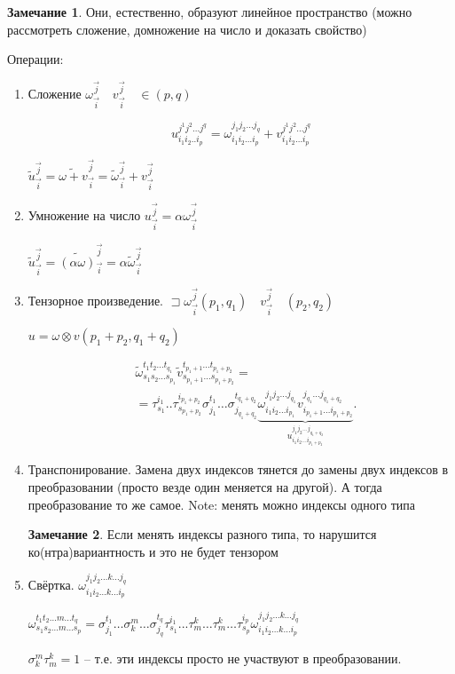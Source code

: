 \documentclass{book}
\newcommand{\tl}[1]{\widetilde{#1}}
\theoremstyle{definition}
\newtheorem*{note}{Замечание}
\begin{document}
\begin{note}
    Они, естественно, образуют линейное пространство (можно рассмотреть сложение, домножение на число и доказать свойство)
\end{note}

Операции:
\begin{enumerate}
    \item Сложение \quad $\omega_{\vec i}^{\vec j}\quad v_{\vec i}^{\vec j}\quad \in (p,q)$

         \[
         u_{i_1i_2 .. i_p}^{j^1 j^2 \ldots j^q} = \omega_{i_1i_2 \ldots i_p}^{j_1j_2 \ldots j_q} + v_{i_1i_2 \ldots i_p}^{j^1 j^2 \ldots j^q} \]

             $\tl u_{\vec i}^{\vec j} = \tl{\omega + v}_{\vec i}^{\vec j} = \tl \omega_{\vec i}^{\vec j} + v_{\vec i }^{\vec j}$
         \item Умножение на число $u_{\vec i}^{\vec j} = \alpha \omega_{\vec i}^{\vec j}$

             $\tl u_{\vec i}^{\vec j} = \tl {\left( \alpha \omega \right) }_{\vec i}^{\vec j} = \alpha \tl {\omega}_{\vec i}^{\vec j}$
         \item Тензорное произведение. $\sqsupset \omega_{\vec i}^{\vec j} \left( p_1, q_1 \right) \quad v_{\vec i}^{\vec j}\quad (p_2, q_2)$

             $u = \omega \otimes v \left( p_1+p_2, q_1+q_2 \right) $

    \begin{align*}
    &\tl \omega_{s_1s_2 \ldots s_{p_1}}^{t_1t_2 \ldots t_{q_1}}\tl v_{s_{p_1+1} \ldots s_{p_1+p_2}}^{t_{p_1+1} ... t_{p_1+p_2}} =\\
    &= \tau_{s_1}^{i_1} ..  \tau_{s_{p_1+p_2}}^{i_{p_1+p_2}} \sigma_{j_1}^{t_1} \ldots \sigma_{j_{q_1+q_2}}^{t_{q_1+q_2}} \underbrace{\omega_{i_1i_2 \ldots i_{p_1}}^{j_1j_2 \ldots j_{q_1}}v_{i_{p_1+1}\ldots i_{p_1+p_2}}^{j_{q_1} \ldots j_{q_1+q_2}}}_{u_{i_1 i_2 \ldots i_{p_1+p_2}}^{j_1j_2 \ldots j_{q_1+q_2}}}
    .\end{align*}
\item Транспонирование. Замена двух индексов тянется до замены двух индексов в преобразовании (просто везде один меняется на другой). А тогда преобразование то же самое. Note: менять можно индексы одного типа
    \begin{note}
        Если менять индексы разного типа, то нарушится ко(нтра)вариантность и это не будет тензором
    \end{note}
\item Свёртка. $\omega_{i_1 i_2 \ldots k \ldots i_p}^{j_1 j_2 \ldots k \ldots j_q}$

    $\omega_{s_1s_2 \ldots m \ldots s_p}^{t_1t_2 \ldots m \ldots t_q} = \sigma_{j_1}^{t_1} \ldots \sigma_k^m \ldots \sigma_{j_q}^{t_q}\tau_{s_1}^{i_1} ... \tau_m^k \ldots \tau_m^k \ldots \tau_{s_p}^{i_p}\omega_{i_1i_2 \ldots k \ldots i_p}^{j_1j_2 \ldots k \ldots j_q}$

    $\sigma_k^m\tau_m^k = 1$ -- т.е. эти индексы просто не участвуют в преобразовании.

\end{enumerate}
\end{document}
